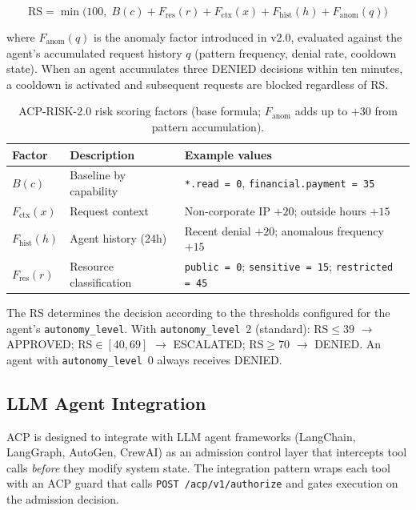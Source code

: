 \documentclass[11pt]{article}
\theoremstyle{definition}
\begin{document}
\[
\text{RS} = \min\!\bigl(100,\; B(c) + F_{\text{res}}(r) + F_{\text{ctx}}(x) + F_{\text{hist}}(h) + F_{\text{anom}}(q)\bigr)
\]

\noindent where $F_{\text{anom}}(q)$ is the anomaly factor introduced in v2.0, evaluated against the agent's accumulated request history $q$ (pattern frequency, denial rate, cooldown state). When an agent accumulates three DENIED decisions within ten minutes, a cooldown is activated and subsequent requests are blocked regardless of RS.

\begin{table}[h!]
\centering
\small
\begin{tabular}{@{}llp{5.5cm}@{}}
\toprule
\textbf{Factor} & \textbf{Description} & \textbf{Example values} \\
\midrule
$B(c)$ & Baseline by capability & \texttt{*.read = 0}, \texttt{financial.payment = 35} \\
$F_{\text{ctx}}(x)$ & Request context & Non-corporate IP $+20$; outside hours $+15$ \\
$F_{\text{hist}}(h)$ & Agent history (24h) & Recent denial $+20$; anomalous frequency $+15$ \\
$F_{\text{res}}(r)$ & Resource classification & \texttt{public = 0}; \texttt{sensitive = 15}; \texttt{restricted = 45} \\
\bottomrule
\end{tabular}
\caption{ACP-RISK-2.0 risk scoring factors (base formula; $F_{\text{anom}}$ adds up to $+30$ from pattern accumulation).}
\end{table}

The RS determines the decision according to the thresholds configured for the agent's \texttt{autonomy\_level}.
With \texttt{autonomy\_level}~2 (standard):
$\text{RS} \leq 39$ $\rightarrow$ APPROVED;
$\text{RS} \in [40, 69]$ $\rightarrow$ ESCALATED;
$\text{RS} \geq 70$ $\rightarrow$ DENIED.
An agent with \texttt{autonomy\_level}~0 always receives DENIED.

\subsection{LLM Agent Integration}
\label{sec:llm-agent-integration}

ACP is designed to integrate with LLM agent frameworks (LangChain, LangGraph,
AutoGen, CrewAI) as an admission control layer that intercepts tool calls
\emph{before} they modify system state.
The integration pattern wraps each tool with an ACP guard that calls
\texttt{POST /acp/v1/authorize} and gates execution on the admission decision.
\end{document}
